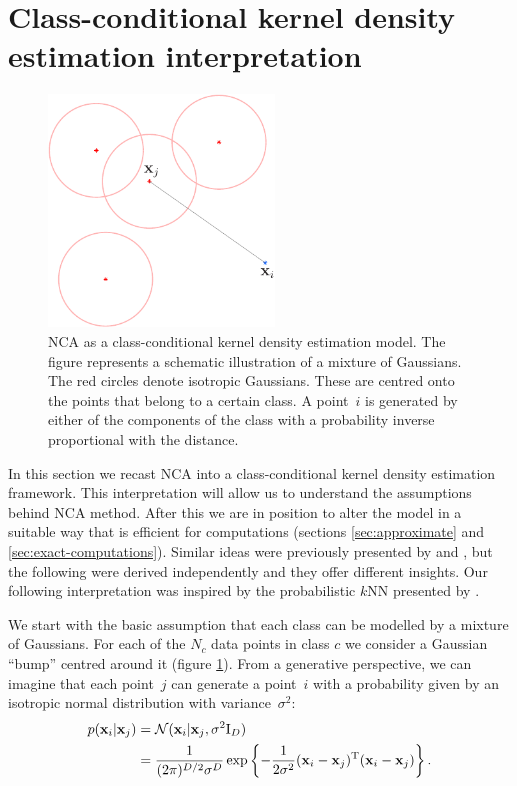 	
\section{Class-conditional kernel density estimation interpretation}
\label{sec:cc-kde}
	
	\begin{figure}
	  \centering
	  \includegraphics[width=6cm]{images/mog}
	  \caption[NCA as a class-conditional kernel density estimation model]{NCA as a class-conditional kernel density estimation
	model. The figure represents a schematic illustration of a mixture of Gaussians. The red circles denote isotropic Gaussians. These are centred onto the points that belong to a certain class. A point~$i$ is generated by either of the components of the class with a probability inverse proportional with the distance.}
	  \label{fig:kde}
	\end{figure}
	
	In this section we recast NCA into a class-conditional kernel density
	estimation framework. This interpretation will allow us to understand the assumptions behind NCA method. After this we are in position to alter the model in a suitable way that is efficient for computations (sections \ref{sec:approximate} and \ref{sec:exact-computations}).
	Similar ideas were previously presented by \citet{weinberger2007} and \citet{singh2010}, but the following were derived
	independently and they offer different insights. Our following interpretation
	was inspired by the probabilistic $k$NN presented by \citet{barber2011}.
	
	We start with the basic assumption that each class can be modelled by a mixture
	of Gaussians. For each of the $N_c$ data points in class $c$ we consider a
	Gaussian ``bump'' centred around it (figure \ref{fig:kde}). From a generative perspective, we can imagine
	that each point~$j$ can generate a point~$i$ with a probability given by
	an isotropic normal distribution with variance~$\sigma^2$:
	\begin{align}
	    p(\mathbf{x}_i|\mathbf{x}_j) &= \mathcal{N}(\mathbf{x}_i|\mathbf{x}_j, \sigma^2\mathrm{I}_D) \\
	                   &= \frac{1}{(2\pi)^{D/2}\sigma^D}\exp \left\{-\frac{1}{2\sigma^2}
	(\mathbf{x}_i - \mathbf{x}_j)^\mathrm{T}(\mathbf{x}_i - \mathbf{x}_j)\right\}.
	\end{align}
	

